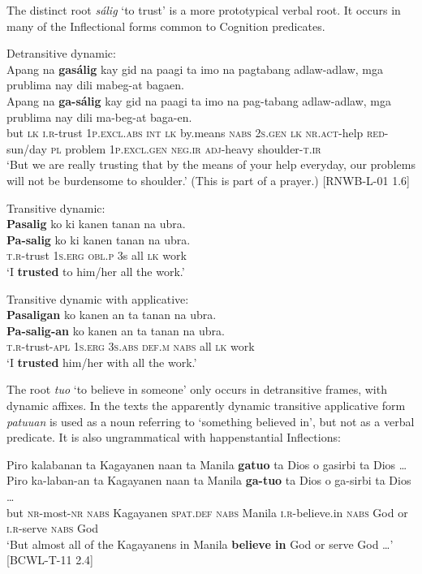The distinct root \textit{sálig} ‘to trust’ is a more prototypical verbal root. It occurs in many of the Inflectional forms common to Cognition predicates.

\ea
Detransitive dynamic: \\
Apang  na  \textbf{gasálig}  kay  gid  na  paagi  ta  imo  na  pagtabang adlaw-adlaw,  mga  prublima  nay  dili  mabeg-at   bagaen. \\\smallskip
\gll Apang  na  \textbf{ga-sálig}  kay  gid  na  paagi  ta  imo  na  pag-tabang adlaw-adlaw,  mga  prublima  nay  dili  ma-beg-at   baga-en. \\
but  \textsc{lk}  \textsc{i.r}-trust  1\textsc{p.excl.abs}  \textsc{int}  \textsc{lk}  by.means  \textsc{nabs}  2\textsc{s.gen}  \textsc{lk}  \textsc{nr.act}-help
\textsc{red}-sun/day  \textsc{pl}  problem  1\textsc{p.excl.gen}  \textsc{neg.ir}  \textsc{adj}-heavy  shoulder-\textsc{t.ir} \\
\glt `But we are really trusting that by the means of your help everyday, our problems will not be burdensome to shoulder.’ (This is part of a prayer.)  [RNWB-L-01 1.6]
\z

\ea
Transitive dynamic: \\
\textbf{Pasalig}  ko  ki  kanen  tanan  na  ubra. \\\smallskip
\gll \textbf{Pa-salig}  ko  ki  kanen  tanan  na  ubra. \\
\textsc{t.r}-trust  1\textsc{s.erg}  \textsc{obl.p}  3s  all  \textsc{lk}  work \\
\glt ‘I \textbf{trusted} to him/her all the work.’
\z

\ea
Transitive dynamic with applicative: \\
\textbf{Pasaligan}  ko  kanen  an  ta  tanan  na  ubra. \\\smallskip
\gll \textbf{Pa-salig-an}  ko  kanen  an  ta  tanan  na  ubra. \\
\textsc{t.r}-trust-\textsc{apl}  1\textsc{s.erg}  3\textsc{s.abs}  \textsc{def.m}  \textsc{nabs}  all  \textsc{lk}  work \\
\glt ‘I \textbf{trusted} him/her with all the work.’
\z

The root \textit{tuo} ‘to believe in someone’ only occurs in detransitive frames, with dynamic affixes. In the texts the apparently dynamic transitive applicative form \textit{patuuan} is used as a noun referring to ‘something believed in’, but not as a verbal predicate. It is also ungrammatical with happenstantial Inflections:

\ea
Piro  kalabanan  ta  Kagayanen  naan  ta  Manila  \textbf{gatuo} ta  Dios  o  gasirbi  ta  Dios … \\\smallskip
\gll Piro  ka-laban-an  ta  Kagayanen  naan  ta  Manila  \textbf{ga-tuo} ta  Dios  o  ga-sirbi  ta  Dios … \\
but  \textsc{nr}-most-\textsc{nr}  \textsc{nabs}  Kagayanen  \textsc{spat.def}  \textsc{nabs}  Manila  \textsc{i.r}-believe.in
\textsc{nabs}  God  or  \textsc{i.r}-serve  \textsc{nabs}  God \\
\glt `But almost all of the Kagayanens in Manila \textbf{believe in} God or serve God …’ [BCWL-T-11 2.4]
\z

